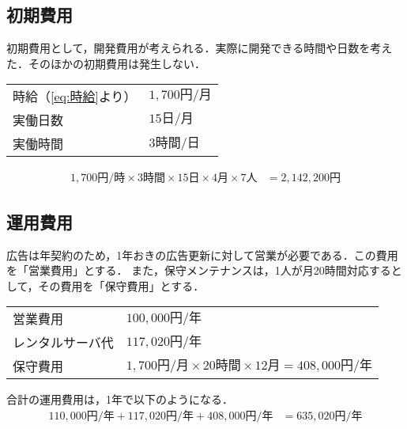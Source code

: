 \subsection{初期費用}
初期費用として，開発費用が考えられる．実際に開発できる時間や日数を考えた．そのほかの初期費用は発生しない．
\begin{framed}
    \begin{tabular}{ll}
        時給（\eqref{eq:時給}より） & \(1,700\text{円/月}\) \\
        実働日数                & \(15\text{日/月}\)    \\
        実働時間                & \(3\text{時間/日}\)
    \end{tabular}
\end{framed}
\begin{equation}
    \begin{aligned}
        1,700{円/時}\times 3\text{時間}\times 15\text{日}\times 4\text{月}\times 7\text{人} & = 2,142,200\text{円}\label{eq:開発費用}
    \end{aligned}
\end{equation}
\subsection{運用費用}
広告は年契約のため，1年おきの広告更新に対して営業が必要である．この費用を「営業費用」とする．
また，保守メンテナンスは，1人が月20時間対応するとして，その費用を「保守費用」とする．
\begin{framed}
    \begin{tabular}{ll}
        営業費用     & \(100,000\text{円/年}\)                                                    \\
        レンタルサーバ代 & \(117,020\text{円/年}\)                                                    \\
        保守費用     & \(1,700\text{円/月}\times 20\text{時間}\times 12\text{月}=408,000\text{円/年}\) \\
    \end{tabular}
\end{framed}
合計の運用費用は，1年で以下のようになる．
\begin{equation}
    \begin{aligned}
        110,000\text{円/年}+117,020\text{円/年}+408,000\text{円/年} & =635,020\text{円/年}\label{eq:運用費用}
    \end{aligned}
\end{equation}
